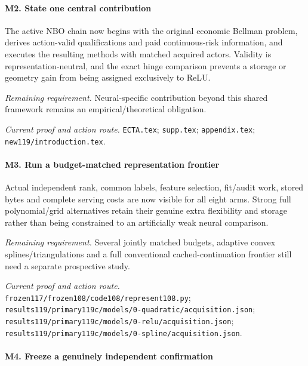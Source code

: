 \paragraph{M2. State one central contribution}

The active NBO chain now begins with the original economic Bellman problem, derives action-valid qualifications and paid continuous-risk information, and executes the resulting methods with matched acquired actors. Validity is representation-neutral, and the exact hinge comparison prevents a storage or geometry gain from being assigned exclusively to ReLU.

\par\emph{Remaining requirement.} Neural-specific contribution beyond this shared framework remains an empirical/\allowbreak{}theoretical obligation.

\par\emph{Current proof and action route.} \nolinkurl{ECTA.tex}; \nolinkurl{supp.tex}; \nolinkurl{appendix.tex}; \nolinkurl{new119/introduction.tex}.

\paragraph{M3. Run a budget-matched representation frontier}

Actual independent rank, common labels, feature selection, fit/\allowbreak{}audit work, stored bytes and complete serving costs are now visible for all eight arms. Strong full polynomial/\allowbreak{}grid alternatives retain their genuine extra flexibility and storage rather than being constrained to an artificially weak neural comparison.

\par\emph{Remaining requirement.} Several jointly matched budgets, adaptive convex splines/\allowbreak{}triangulations and a full conventional cached-continuation frontier still need a separate prospective study.

\par\emph{Current proof and action route.} \nolinkurl{frozen117/frozen108/code108/represent108.py}; \nolinkurl{results119/primary119c/models/0-quadratic/acquisition.json}; \nolinkurl{results119/primary119c/models/0-relu/acquisition.json}; \nolinkurl{results119/primary119c/models/0-spline/acquisition.json}.

\paragraph{M4. Freeze a genuinely independent confirmation}

